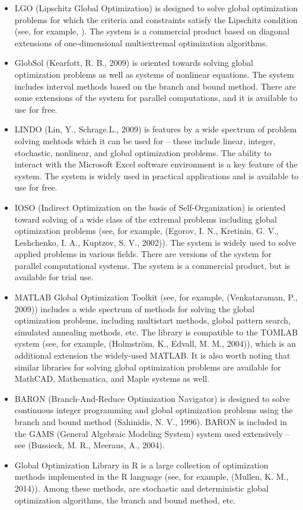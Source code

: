 \documentclass{gOMS2e}
\theoremstyle{plain}%
\theoremstyle{definition}
\theoremstyle{remark}
\begin{document}
\begin{itemize}
\item LGO (Lipschitz Global Optimization) is designed to solve global optimization
problems for which the criteria and constraints satisfy the Lipschitz condition (see, for example, \cite{pinterGO}).
The system is a commercial product based on diagonal extensions of one-dimensional
multiextremal optimization algorithms.
\item GlobSol (Kearfott, R. B., 2009) is oriented towards solving global optimization problems as well as
systems of nonlinear equations. The system includes interval methods based on the branch and
bound method. There are some extensions of the system for parallel computations, and it is available to use for free.
\item LINDO (Lin, Y., Schrage.L., 2009) is features by a wide spectrum of problem solving mehtods which
it can be used for – these include linear, integer, stochastic, nonlinear, and global
optimization problems. The ability to interact with the Microsoft Excel software
environment is a key feature of the system. The system is widely used in practical
applications and is available to use for free.
\item IOSO (Indirect Optimization on the basis of Self-Organization) is oriented
toward solving of a wide class of the extremal problems including global optimization
problems (see, for example, (Egorov, I. N., Kretinin, G. V., Leshchenko, I. A., Kuptzov, S. V., 2002)). The system is widely used to
solve applied problems in various fields. There are versions of the system for parallel
computational systems. The system is a commercial product, but is available for trial use.
\item MATLAB Global Optimization Toolkit (see, for example, (Venkataraman, P., 2009)) includes a wide spectrum
of methods for solving the global optimization problems, including multistart methods,
global pattern search, simulated annealing methods, etc. The library is compatible to the
TOMLAB system (see, for example, (Holmström, K., Edvall, M. M., 2004)), which is an additional extension the widely-used MATLAB.
It is also worth noting that similar libraries for solving global optimization problems are
available for MathCAD, Mathematica, and Maple systems as well.
\item BARON (Branch-And-Reduce Optimization Navigator) is designed to solve continuous
integer programming and global optimization problems using the branch and bound method (Sahinidis, N. V., 1996).
BARON is included in the GAMS (General Algebraic Modeling System) system used extensively – see (Bussieck, M. R., Meeraus, A., 2004).
\item Global Optimization Library in R is a large collection of optimization methods
implemented in the R language (see, for example, (Mullen, K. M., 2014)). Among these methods, are stochastic and deterministic global optimization algorithms,
the branch and bound method, etc.
\end{itemize}
\end{document}

